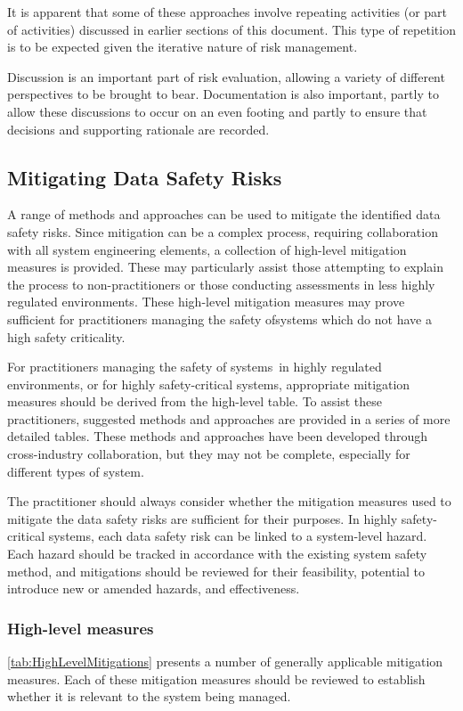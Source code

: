 It is apparent that some of these approaches involve repeating activities (or part of activities) discussed in earlier sections of this document. This type of repetition is to be expected given the iterative nature of risk management.

Discussion is an important part of risk evaluation, allowing a variety of different perspectives to be brought to bear. Documentation is also important, partly to allow these discussions to occur on an even footing and partly to ensure that decisions and supporting rationale are recorded.

\subsection{Mitigating Data Safety Risks}
A range of methods and approaches can be used to mitigate the identified data safety risks. Since \gls{mitigation} can be a complex process, requiring collaboration with all system engineering elements, a collection of high-level \gls{mitigation} measures is provided. These may particularly assist those attempting to explain the process to non-practitioners or those conducting assessments in less highly regulated environments. These high-level \gls{mitigation} measures may prove sufficient for practitioners \cbstart managing the safety of\cbend systems which do not have a high safety criticality.

For practitioners \cbstart managing the safety of systems\cbend\ in highly regulated environments, or for highly safety-critical systems, appropriate \gls{mitigation} measures should be derived from the high-level table. To assist these practitioners, suggested methods and approaches are provided in a series of more detailed tables. These methods and approaches have been developed through cross-industry collaboration, but they may not be complete, especially for different types of system. 

The practitioner should always consider whether the \gls{mitigation} measures used to mitigate the data safety risks are sufficient for their purposes. In highly safety-critical systems, each data safety risk can be linked to a system-level hazard. Each hazard  should be tracked in accordance with the existing system safety method, and \glspl{mitigation}  should be reviewed for their feasibility, potential to introduce new or amended hazards, and effectiveness.

\subsubsection{High-level  measures}
\autoref{tab:HighLevelMitigations} presents a number of generally applicable \gls{mitigation} measures.
Each of these \gls{mitigation} measures should be reviewed to establish whether it is relevant to the system \cbstart being managed\cbend.

